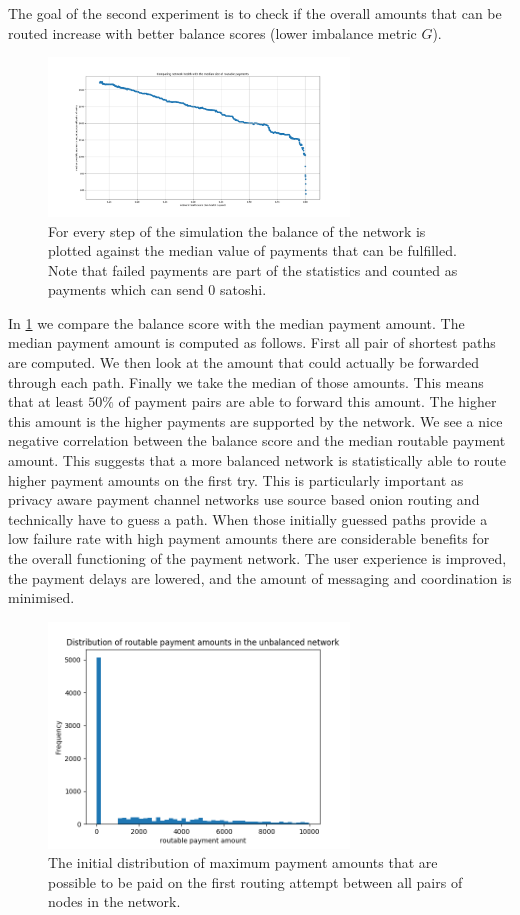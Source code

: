 \documentclass[a4paper]{paper}
\begin{document}
The goal of the second experiment is to check if the overall amounts that can be routed increase with better balance scores (lower imbalance metric $G$).

\begin{figure}
 \centering
 \includegraphics[width=8cm]{code/results/routabilityTest/health vs payment amt.png}
 \caption{For every step of the simulation the balance of the network is plotted against the median value of payments that can be fulfilled. 
 Note that failed payments are part of the statistics and counted as payments which can send $0$ satoshi.}
 \label{fig:healthVsPayment}
\end{figure}

In \cref{fig:healthVsPayment} we compare the balance score with the median payment amount.
The median payment amount is computed as follows.
First all pair of shortest paths are computed.
We then look at the amount that could actually be forwarded through each path.
Finally we take the median of those amounts.
This means that at least $50\%$ of payment pairs are able to forward this amount.
The higher this amount is the higher payments are supported by the network.
We see a nice negative correlation between the balance score and the median routable payment amount.
This suggests that a more balanced network is statistically able to route higher payment amounts on the first try.
This is particularly important as privacy aware payment channel networks use source based onion routing and technically have to guess a path. When those initially guessed paths provide a low failure rate with high payment amounts there are considerable benefits for the overall functioning of the payment network. 
The user experience is improved, the payment delays are lowered, and the amount of messaging and coordination is minimised. 

\begin{figure}
 \centering
 \includegraphics[width=8cm]{code/results/routabilityTest/paymentamtUnbalanced.png}
 \caption{The initial distribution of maximum payment amounts that are possible to be paid on the first routing attempt between all pairs of nodes in the network.}
 \label{fig:paymentUnbalanced}
\end{figure}
\end{document}
